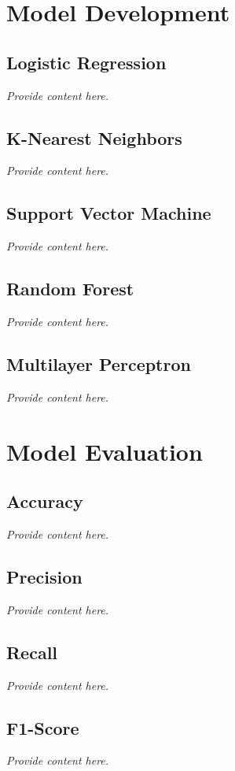 \documentclass[12pt, a4paper]{article}
\begin{document}
\section{Model Development}
\subsection{Logistic Regression}
\textit{Provide content here.}

\subsection{K-Nearest Neighbors}
\textit{Provide content here.}

\subsection{Support Vector Machine}
\textit{Provide content here.}

\subsection{Random Forest}
\textit{Provide content here.}

\subsection{Multilayer Perceptron}
\textit{Provide content here.}

\section{Model Evaluation}
\subsection{Accuracy}
\textit{Provide content here.}

\subsection{Precision}
\textit{Provide content here.}

\subsection{Recall}
\textit{Provide content here.}

\subsection{F1-Score}
\textit{Provide content here.}
\end{document}
